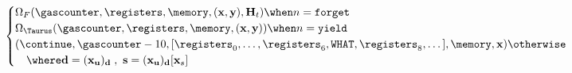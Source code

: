 {\begin{align}
\begin{cases}
            \Omega_F(\gascounter, \registers, \memory, (\mathbf{x}, \mathbf{y}), \mathbf{H}_t) \when n = \mathtt{forget} \\
            \Omega_\Taurus(\gascounter, \registers, \memory, (\mathbf{x}, \mathbf{y})) \when n = \mathtt{yield} \\
            (\continue, \gascounter - 10, [\registers_0, \dots, \registers_6, \mathtt{WHAT}, \registers_8, \dots], \memory, \mathbf{x}) \otherwise\\
            \quad \where \mathbf{d} = (\mathbf{x}_\mathbf{u})_\mathbf{d}\;,\ \mathbf{s} = (\mathbf{x}_\mathbf{u})_\mathbf{d}[\mathbf{x}_s]
        \end{cases}
    \end{align}
}
\newcommand{\equationbpointeleven}{
    \begin{align}
        G\colon\left\{\begin{aligned}
            ((\{\continue, \halt, \panic, \oog\}, \N_G, \regs, \ram, \mathbb{A}), (\mathbf{X}, \mathbf{X})) \to (\{\continue, \halt, \panic, \oog\}, \N_G, \regs, \ram, (\mathbf{X}, \mathbf{X})) \\
            ((\execst, \gascounter, \registers, \memory, \mathbf{s}), (\mathbf{x}, \mathbf{y})) \mapsto (\execst, \gascounter, \registers, \memory, (\mathbf{x}^*, \mathbf{y})) \\
            \qquad \where \mathbf{x}^* = \mathbf{x} \exc (\mathbf{x}^*_\mathbf{u})_\mathbf{d}[\mathbf{x}^*_s] = \mathbf{s}
        \end{aligned}\right.
    \end{align}
}
\newcommand{\equationbpointtwelve}{
    \begin{align}
        C\colon\left\{\begin{aligned}
            (\N_G, \mathbb{Y} \cup \{\oog, \panic\}, (\mathbf{X}, \mathbf{X})) \to (\partialstate, \defxfers, \H\bm{?}, \N_G) \\
            (g, \mathbf{o}, (\mathbf{x}, \mathbf{y})) \mapsto \begin{cases}
            \tup{
                \mathbf{y}_\mathbf{u},
                \mathbf{y}_\mathbf{t},
                \mathbf{y}_y,
                g
            }  \when \mathbf{o} \in \{\oog, \panic\} \\
            \tup{
                \mathbf{x}_\mathbf{u},
                \mathbf{x}_\mathbf{t},
                \mathbf{o},
                g
            }  \otherwhen \mathbf{o} \in \H \\
            \tup{
                \mathbf{x}_\mathbf{u},
                \mathbf{x}_\mathbf{t},
                \mathbf{x}_y,
                g
            }  \otherwise
            \end{cases}
        \end{aligned}\right.
    \end{align}
}
